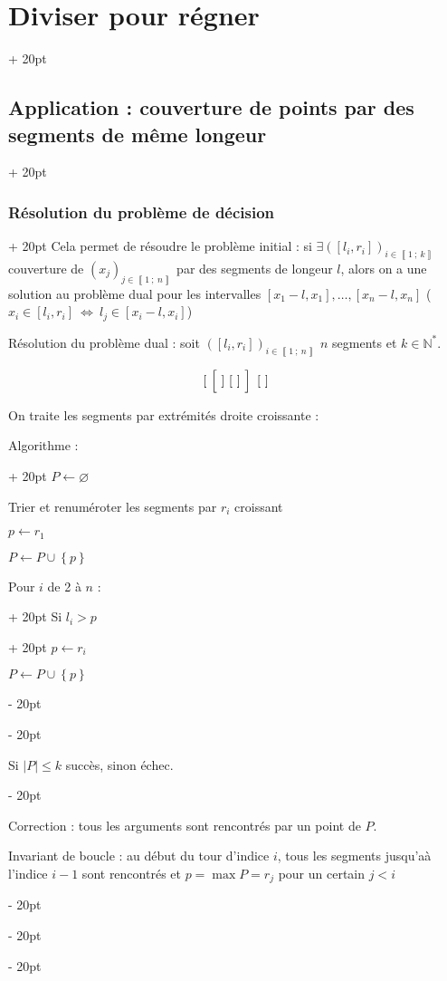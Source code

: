 \documentclass[a4paper, 12pt, twoside]{article}
\newcommand{\N}{\mathbb{N}} %
\newcommand{\nset}[2]{\left\llbracket #1\ ;\ #2 \right\rrbracket}
\newcommand{\set}[1]{\left\{ #1 \right\}}
\newcommand{\abs}[1]{\left\lvert #1 \right\rvert} %
\newcommand{\ssi}{\ \Leftrightarrow \ }
\renewcommand{\le}{\leqslant}
\newcommand{\ind}[1][20pt]{\advance\leftskip + #1}
\newcommand{\deind}[1][20pt]{\advance\leftskip - #1}
\newenvironment{indt}[2][20pt]{#2 \par \ind[#1]}{\par \deind} %
\begin{document}
\begin{indt}{\section{Diviser pour régner}}
\begin{indt}{\subsection{Application : couverture de points par des segments de même longeur}}
\begin{indt}{\subsubsection{Résolution du problème de décision}}
                Cela permet de résoudre le problème initial : si $\exists ([l_i, r_i])_{i \in \nset 1 k}$ couverture de $(x_j)_{j \in \nset 1 n}$ par des segments de longeur $l$, alors on a une solution au problème dual pour les intervalles $[x_1 - l, x_1], \ldots, [x_n - l, x_n]$ ($x_i \in [l_i, r_i] \ssi l_j \in [x_i - l, x_i]$)
                
                \vspace{6pt}
                
                Résolution du problème dual : soit $([l_i, r_i])_{i \in \nset 1 n}$ $n$ segments et $k \in \N^*$.
                
                    \[ [\ \left[\ \vphantom{\dfrac a a} ]\ [\ ]\ \right]\ [\ ] \]
                
                On traite les segments par extrémités droite croissante :
                
                \begin{indt}{Algorithme :}
                    $P \leftarrow \varnothing$
                    
                    Trier et renuméroter les segments par $r_i$ croissant
                    
                    $p \leftarrow r_1$
                    
                    $P \leftarrow P \cup \set p$
                    
                    \begin{indt}{Pour $i$ de 2 à $n$ :}
                        \begin{indt}{Si $l_i > p$}
                            $p \leftarrow r_i$
                            
                            $P \leftarrow P \cup \set p$
                        \end{indt}
                    \end{indt}
                    
                    Si $\abs P \le k$ succès, sinon échec.
                \end{indt}
                
                Correction : tous les arguments sont rencontrés par un point de $P$.
                
                Invariant de boucle : au début du tour d'indice $i$, tous les segments jusqu'aà l'indice $i - 1$ sont rencontrés et $p = \max P = r_j$ pour un certain $j < i$
                

\end{indt}
\end{indt}
\end{indt}
\end{document}
